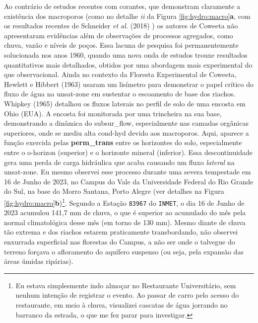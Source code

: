 \documentclass[./main.tex]{subfiles}
\begin{document}
\par Ao contrário de estudos recentes com corantes, que demonstram claramente a existência dos macroporos (como no detalhe \textit{ii} da Figura \ref{fig:hydro:macro}\textbf{a}, com os resultados recentes de Schneider \textit{et al.} (2018) \cite{Schneider2018}) os autores de Coweeta não apresentaram evidências além de observações de processos agregados, como chuva, vazão e níveis de poços. Essa lacuna de pesquisa foi permanentemente solucionada nos anos 1960, quando uma nova onda de estudos trouxe resultados quantitativos mais detalhados, obtidos por uma abordagem mais experimental do que observacional. Ainda no contexto da Floresta Experimental de Coweeta, Hewlett e Hibbert (1963) \cite{Hewlett1963} usaram um lisímetro para demonstrar o papel crítico do fluxo de água na \gls{unsat-zone} em sustentar o escoamento de base dos riachos. Whipkey (1965) \cite{Whipkey1965} detalhou os fluxos laterais no perfil de solo de uma encosta em Ohio (EUA). A encosta foi monitorada por uma trincheira na sua base, demonstrando a dinâmica do \gls{subsur_flow}, especialmente nas camadas orgânicas superiores, onde se mediu alta \gls{cond-hyd} devido aos macroporos. Aqui, aparece a função exercida pelas \textbf{\gls{perm_trans}} entre os horizontes do solo, especialmente entre o \gls{o-horizon} (superior) e o horizonte mineral (inferior). Essa descontinuidade gera uma perda de carga hidráulica que acaba causando um fluxo \textit{lateral} na \gls{unsat-zone}. Eu mesmo observei esse processo durante uma severa tempestade em 16 de Junho de 2023, no Campus do Vale da Universidade Federal do Rio Grande do Sul, na base do Morro Santana, Porto Alegre (ver detalhes na Figura \ref{fig:hydro:macro}\textbf{b})\footnote{Eu estava simplesmente indo almoçar no Restaurante Universitário, sem nenhum intenção de registrar o evento. Ao passar de carro pelo acesso do restaurante, em meio à chuva, visualizei cascatas de água jorrando no barranco da estrada, o que me fez parar para investigar.}. Segundo a Estação \texttt{83967} do \texttt{INMET}, o dia 16 de Junho de 2023 acumulou 141,7 mm de chuva, o que é superior ao acumulado do mês pela normal climatológica desse mês (em torno de 130 mm). Mesmo diante de chuva tão extrema e dos riachos estarem praticamente transbordando, não observei enxurrada superficial nas florestas do Campus, a não ser onde o talvegue do terreno forçava o afloramento do aquífero suspenso (ou seja, pela expansão das áreas úmidas ripárias).
\end{document}
